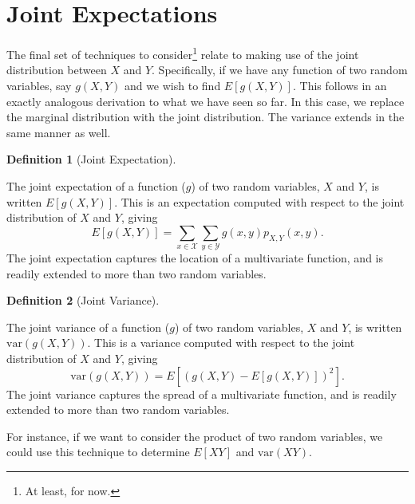 \documentclass[
  letterpaper,
  DIV=11,
  numbers=noendperiod]{scrreprt}
\theoremstyle{definition}
\theoremstyle{definition}
\theoremstyle{definition}
\newtheorem{definition}{Definition}[chapter]
\theoremstyle{remark}
\begin{document}
\section{Joint Expectations}\label{joint-expectations}

The final set of techniques to consider\footnote{At least, for now.}
relate to making use of the joint distribution between \(X\) and \(Y\).
Specifically, if we have any function of two random variables, say
\(g(X,Y)\) and we wish to find \(E[g(X,Y)]\). This follows in an exactly
analogous derivation to what we have seen so far. In this case, we
replace the marginal distribution with the joint distribution. The
variance extends in the same manner as well.

\begin{definition}[Joint
Expectation]\protect\hypertarget{def-joint-expectation}{}\label{def-joint-expectation}

The joint expectation of a function (\(g\)) of two random variables,
\(X\) and \(Y\), is written \(E[g(X,Y)]\). This is an expectation
computed with respect to the joint distribution of \(X\) and \(Y\),
giving
\[E[g(X,Y)] = \sum_{x\in\mathcal{X}}\sum_{y\in\mathcal{Y}}g(x,y)p_{X,Y}(x,y).\]
The joint expectation captures the location of a multivariate function,
and is readily extended to more than two random variables.

\end{definition}

\begin{definition}[Joint
Variance]\protect\hypertarget{def-joint-variance}{}\label{def-joint-variance}

The joint variance of a function (\(g\)) of two random variables, \(X\)
and \(Y\), is written \(\text{var}(g(X,Y))\). This is a variance
computed with respect to the joint distribution of \(X\) and \(Y\),
giving \[\text{var}(g(X,Y)) = E[(g(X,Y) - E[g(X,Y)])^2].\] The joint
variance captures the spread of a multivariate function, and is readily
extended to more than two random variables.

\end{definition}

For instance, if we want to consider the product of two random
variables, we could use this technique to determine \(E[XY]\) and
\(\text{var}(XY)\).
\end{document}
